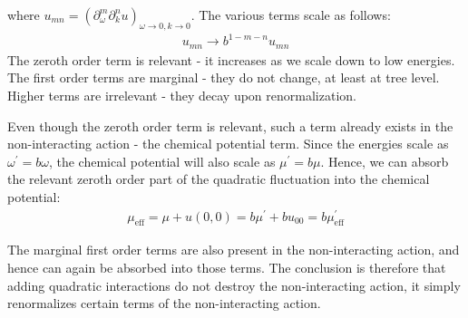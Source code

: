 \documentclass[14pt]{extarticle}
\begin{document}
where \(u_{mn} = \left(\partial^m_\omega \partial^n_k u\right)_{\omega \to 0, k \to 0}\). The various terms scale as follows:
\begin{equation}\begin{aligned}
	u_{mn} \to b^{1 - m - n}u_{mn}
\end{aligned}\end{equation}
The zeroth order term is relevant - it increases as we scale down to low energies. The first order terms are marginal - they do not change, at least at tree level. Higher terms are irrelevant - they decay upon renormalization.

Even though the zeroth order term is relevant,  such a term already exists in the non-interacting action - the chemical potential term. Since the energies scale as \(\omega^\prime = b\omega\), the chemical potential will also scale as \(\mu^\prime = b \mu\). Hence, we can absorb the relevant zeroth order part of the quadratic fluctuation into the chemical potential:
\begin{gather}
	\mu_\text{eff} = \mu + u(0,0) = b \mu^\prime + bu_{00} = b \mu_\text{eff}^\prime
\end{gather}

The marginal first order terms are also present in the non-interacting action, and hence can again be absorbed into those terms. The conclusion is therefore that adding quadratic interactions do not destroy the non-interacting action, it simply renormalizes certain terms of the non-interacting action.
\end{document}
